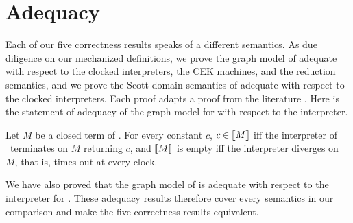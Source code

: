 
\section{Adequacy}
\label{sec:adequacy}

Each of our five correctness results speaks of a different semantics.
As due diligence on our mechanized definitions, we prove the graph
model of \fpc{} adequate with respect to the clocked interpreters, the
CEK machines, and the reduction semantics, and we prove the
Scott-domain semantics of \fpc{} adequate with respect to the clocked
interpreters. Each proof adapts a proof from the literature
\citep{Plotkin:1977oc,Plotkin:1985aa,Winskel:1993uq,Siek:2017ab}.
Here is the statement of adequacy of the graph model for \fpc{} with
respect to the interpreter.

\begin{proposition}[Adequacy]\label{prop:adequacy}
Let $M$ be a closed term of \fpc. For every constant $c$, $c \in
\llbracket M \rrbracket$ iff the interpreter of \fpc\ terminates on $M$ returning $c$,
and $\llbracket M \rrbracket$ is empty iff the interpreter diverges on $M$, that is,
times out at every clock.
\end{proposition}

We have also proved that the graph model of \instr{} is adequate with
respect to the interpreter for \instr{}. These adequacy results
therefore cover every semantics in our comparison and make the five
correctness results equivalent.
